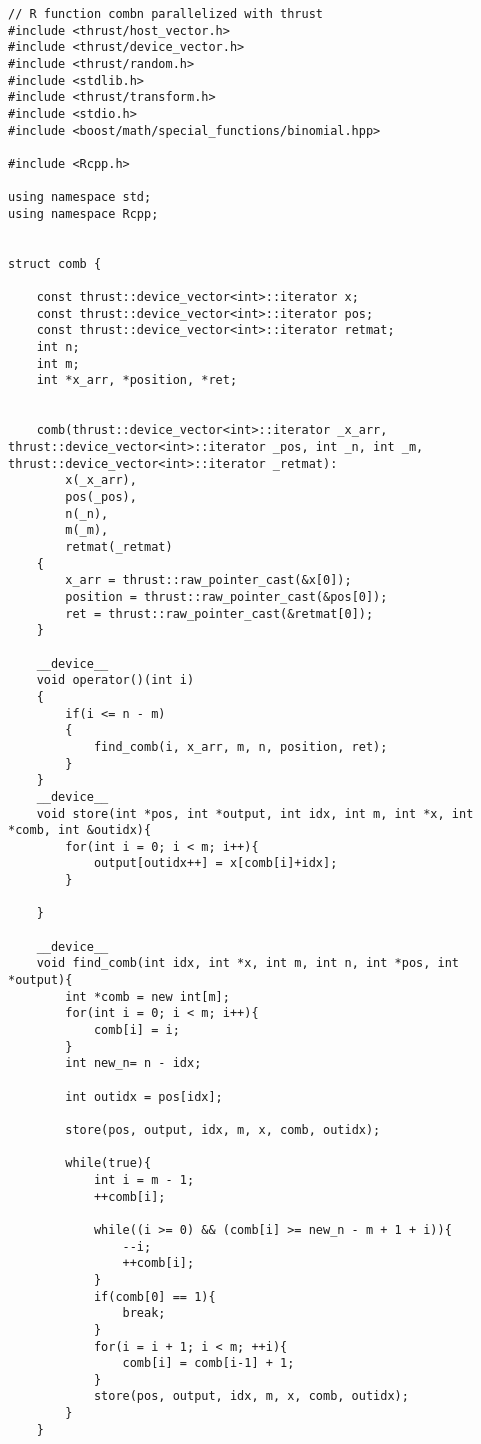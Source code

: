{



\begin{lstlisting}
// R function combn parallelized with thrust
#include <thrust/host_vector.h>
#include <thrust/device_vector.h>
#include <thrust/random.h>
#include <stdlib.h>
#include <thrust/transform.h>
#include <stdio.h>
#include <boost/math/special_functions/binomial.hpp>

#include <Rcpp.h>

using namespace std; 
using namespace Rcpp;


struct comb {
	
	const thrust::device_vector<int>::iterator x;
	const thrust::device_vector<int>::iterator pos;
	const thrust::device_vector<int>::iterator retmat;
	int n;
	int m;
	int *x_arr, *position, *ret;


	comb(thrust::device_vector<int>::iterator _x_arr, thrust::device_vector<int>::iterator _pos, int _n, int _m, thrust::device_vector<int>::iterator _retmat):
		x(_x_arr),
		pos(_pos),
		n(_n),
		m(_m),
		retmat(_retmat)
	{
		x_arr = thrust::raw_pointer_cast(&x[0]);		
		position = thrust::raw_pointer_cast(&pos[0]);
		ret = thrust::raw_pointer_cast(&retmat[0]);
	}
	
	__device__
	void operator()(int i)
	{
        if(i <= n - m)
        {
            find_comb(i, x_arr, m, n, position, ret);
        }
	}
	__device__
	void store(int *pos, int *output, int idx, int m, int *x, int *comb, int &outidx){
		for(int i = 0; i < m; i++){
			output[outidx++] = x[comb[i]+idx];
		}

	}

	__device__
	void find_comb(int idx, int *x, int m, int n, int *pos, int *output){
		int *comb = new int[m];
		for(int i = 0; i < m; i++){
			comb[i] = i;
		}
		int new_n= n - idx;
        
        int outidx = pos[idx];
        
		store(pos, output, idx, m, x, comb, outidx);

		while(true){
			int i = m - 1;
			++comb[i];
	
			while((i >= 0) && (comb[i] >= new_n - m + 1 + i)){
				--i;
				++comb[i];
			}
			if(comb[0] == 1){
				break;
			}
			for(i = i + 1; i < m; ++i){
				comb[i] = comb[i-1] + 1;
			}
            store(pos, output, idx, m, x, comb, outidx);
		}
	}


\end{lstlisting}}
